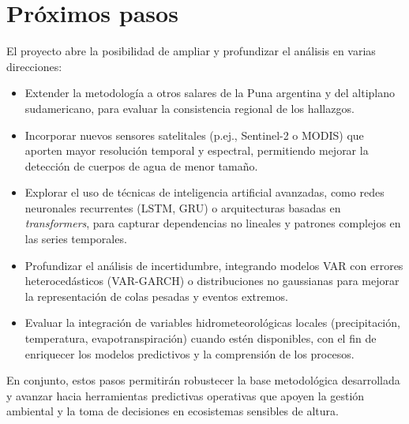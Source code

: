 
\section{Próximos pasos}

El proyecto abre la posibilidad de ampliar y profundizar el análisis en varias direcciones:

\begin{itemize}
    \item Extender la metodología a otros salares de la Puna argentina y del altiplano sudamericano, para evaluar la consistencia regional de los hallazgos.
    \item Incorporar nuevos sensores satelitales (p.ej., Sentinel-2 o MODIS) que aporten mayor resolución temporal y espectral, permitiendo mejorar la detección de cuerpos de agua de menor tamaño.
    \item Explorar el uso de técnicas de inteligencia artificial avanzadas, como redes neuronales recurrentes (LSTM, GRU) o arquitecturas basadas en \textit{transformers}, para capturar dependencias no lineales y patrones complejos en las series temporales.
    \item Profundizar el análisis de incertidumbre, integrando modelos VAR con errores heterocedásticos (VAR-GARCH) o distribuciones no gaussianas para mejorar la representación de colas pesadas y eventos extremos.
    \item Evaluar la integración de variables hidrometeorológicas locales (precipitación, temperatura, evapotranspiración) cuando estén disponibles, con el fin de enriquecer los modelos predictivos y la comprensión de los procesos.
\end{itemize}

En conjunto, estos pasos permitirán robustecer la base metodológica desarrollada y avanzar hacia herramientas predictivas operativas que apoyen la gestión ambiental y la toma de decisiones en ecosistemas sensibles de altura.
